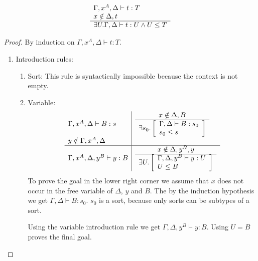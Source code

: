 \begin{lemma}
    \label{Condensing1}
    $$
    \begin{array}{l} 
        \Gamma,x^A,\Delta \vdash t: T
        \\
        x \notin \Delta, t
     \\ \hline 
        \exists U. \Gamma, \Delta \vdash t : U \land U \le T
    \end{array}
    $$

    \begin{proof}
        {\newcommand{\goal}[4]{
            \ruleh {
                x \notin #1, #2
            }
            {
                \exists #3.
                \left[
                \begin{array}{l}
                    \Gamma,#1 \vdash #2 : #3
                    \\
                    #3 \le #4
                \end{array}
                \right]
            }
         }
        By induction on $\Gamma,x^A,\Delta \vdash t: T$.

        \begin{enumerate}
            \item Introduction rules:
            \begin{enumerate}
                \item Sort: This rule is syntactically impossible because the
                    context is not empty.

                \item Variable:
                $$
                \begin{array}{l|l}
                    \Gamma,x^A,\Delta \vdash B : s
                    &
                    \goal \Delta B {s_0} s
                    \\
                    y \notin \Gamma,x^A,\Delta
                    \\
                    \hline
                    \Gamma,x^A,\Delta,y^B \vdash y :B
                    &
                    \goal {\Delta,y^B} y U B
                \end{array}
                $$
                To prove the goal in the lower right corner we assume that $x$
                    does not occur in the free variable of $\Delta$, $y$ and
                    $B$. The by the induction hypothesis we get $\Gamma,\Delta
                    \vdash B: s_0$. $s_0$ is a sort, because only sorts can be
                    subtypes of a sort.

                    Using the variable introduction rule we get
                    $\Gamma,\Delta,y^B \vdash y : B$. Using $U = B$ proves the
                    final goal.


\end{enumerate}
\end{enumerate}}
\end{proof}
\end{lemma}
